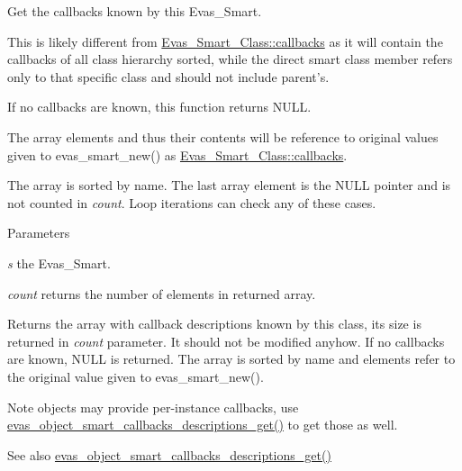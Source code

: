 Get the callbacks known by this Evas\_\-Smart. 

This is likely different from \hyperlink{struct__Evas__Smart__Class_af7074494030024c3d0e502bca7b19067}{Evas\_\-Smart\_\-Class::callbacks} as it will contain the callbacks of all class hierarchy sorted, while the direct smart class member refers only to that specific class and should not include parent's.

If no callbacks are known, this function returns {\ttfamily NULL}.

The array elements and thus their contents will be reference to original values given to evas\_\-smart\_\-new() as \hyperlink{struct__Evas__Smart__Class_af7074494030024c3d0e502bca7b19067}{Evas\_\-Smart\_\-Class::callbacks}.

The array is sorted by name. The last array element is the {\ttfamily NULL} pointer and is not counted in {\itshape count\/}. Loop iterations can check any of these cases.


\begin{DoxyParams}{Parameters}
\item[{\em s}]the Evas\_\-Smart. \item[{\em count}]returns the number of elements in returned array. \end{DoxyParams}
\begin{DoxyReturn}{Returns}
the array with callback descriptions known by this class, its size is returned in {\itshape count\/} parameter. It should not be modified anyhow. If no callbacks are known, {\ttfamily NULL} is returned. The array is sorted by name and elements refer to the original value given to evas\_\-smart\_\-new().
\end{DoxyReturn}
\begin{DoxyNote}{Note}
objects may provide per-\/instance callbacks, use \hyperlink{group__Evas__Smart__Object__Group_gaf58d78bc21229defb9eafd541063391d}{evas\_\-object\_\-smart\_\-callbacks\_\-descriptions\_\-get()} to get those as well. 
\end{DoxyNote}
\begin{DoxySeeAlso}{See also}
\hyperlink{group__Evas__Smart__Object__Group_gaf58d78bc21229defb9eafd541063391d}{evas\_\-object\_\-smart\_\-callbacks\_\-descriptions\_\-get()} 
\end{DoxySeeAlso}
